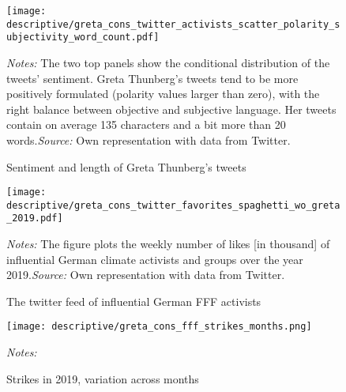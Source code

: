 \restoregeometry
\vspace*{\fill}
\begin{figure}[H]
	\centering\caption{Sentiment and length of Greta Thunberg's tweets}
	\label{fig_greta_cons:twitter_greta_sentiment_length}
	\texttt{[image: descriptive/greta\_cons\_twitter\_activists\_scatter\_polarity\_subjectivity\_word\_count.pdf]}
	\begin{minipage}{0.99\linewidth}
		\scriptsize{\emph{Notes:} The two top panels show the conditional distribution of the tweets' sentiment. Greta Thunberg's tweets tend to be more positively formulated (polarity values larger than zero), with the right balance between objective and subjective language. Her tweets contain on average 135 characters and a bit more than 20 words.\newline\emph{Source:} Own representation with data from Twitter.}
	\end{minipage}
\end{figure}
\vspace*{\fill}\clearpage
\vspace*{\fill}
\begin{figure}[H]
	\centering\caption{The twitter feed of influential German FFF activists}\label{fig_greta_cons:twitter_favorites_activists}
	\texttt{[image: descriptive/greta\_cons\_twitter\_favorites\_spaghetti\_wo\_greta\_2019.pdf]}
	\begin{minipage}{0.99\linewidth}
		\scriptsize{\emph{Notes:} The figure plots the weekly number of likes [in thousand] of influential German climate activists and groups over the year 2019.\newline\emph{Source:} Own representation with data from Twitter.}
	\end{minipage}
\end{figure}
\vspace*{\fill}\clearpage
\vspace*{\fill}
\begin{figure}[H]\centering
	\caption{Strikes in 2019, variation across months}\label{fig_greta_cons:fff_strikes_months}
	\texttt{[image: descriptive/greta\_cons\_fff\_strikes\_months.png]}
	\begin{minipage}{0.99\linewidth}
		\scriptsize{\emph{Notes:} }
	\end{minipage}
\end{figure}
